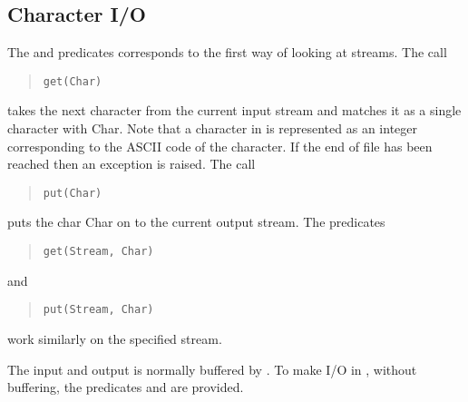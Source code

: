 \subsection{Character I/O}
The %
and
%
predicates corresponds to the first way
of looking at streams. The call
\begin{quote}
\begin{verbatim}
get(Char)
\end{verbatim}
\end{quote}
takes the next character from
the current input stream and matches it as a single character with Char.
Note that a character in {\eclipse} is represented as an integer corresponding
to the ASCII code of the character.
If the end of file has been reached then an exception is raised.
The call
\begin{quote}
\begin{verbatim}
put(Char)
\end{verbatim}
\end{quote}
puts the char Char on to the current output stream.
The predicates
\begin{quote}
\begin{verbatim}
get(Stream, Char)
\end{verbatim}
\end{quote}
 and
\begin{quote}
\begin{verbatim}
put(Stream, Char)
\end{verbatim}
\end{quote}
work similarly on the specified
stream.

The input and output is normally buffered by {\eclipse}.
To make I/O in , without buffering, the
predicates
%
and
%
are provided.

